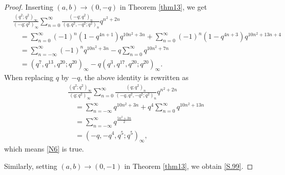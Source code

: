 \documentclass[reqno,12pt]{amsart}
\theoremstyle{remark}
\numberwithin{equation}{section}
\begin{document}
\begin{proof}
Inserting %
$\left(a,b\right)\to\left(0,-q\right)$ in Theorem \ref{thm13}, we get
\begin{align*}
&\frac{\left(q^2;q^2\right)_{\infty}}{\left(-q;q^2\right)_{\infty}}
\sum_{n=0}^{\infty}\frac{\left(-q;q^2\right)_n}{\left(q,q^2,-q^2;q^2\right)_n}q^{n^2+2n}\\
&\quad=\sum_{n=0}^{\infty}\left(-1\right)^n\left(1-q^{4n+1}\right)q^{10n^2+3n}
+\sum_{n=0}^{\infty}\left(-1\right)^n\left(1-q^{4n+3}\right)q^{10n^2+13n+4}\\
&\quad=\sum_{n=-\infty}^{\infty}\left(-1\right)^nq^{10n^2+3n}-q\sum_{n=0}^{\infty}q^{10n^2+7n}\\
&\quad=\left(q^7,q^{13},q^{20};q^{20}\right)_{\infty}-q\left(q^3,q^{17},q^{20};q^{20}\right)_{\infty}.
\end{align*}
When replacing $q$ by $-q$,   the above identity is rewritten as
\begin{align*}
&\frac{\left(q^2;q^2\right)_{\infty}}{\left(q;q^2\right)_{\infty}}
\sum_{n=0}^{\infty}\frac{\left(q;q^2\right)_n}{\left(-q,q^2,-q^2;q^2\right)_n}q^{n^2+2n}\\
&\quad=\sum_{n=-\infty}^{\infty}q^{10n^2+3n}+q^4\sum_{n=0}^{\infty}q^{10n^2+13n}\\
&\quad=\sum_{n=-\infty}^{\infty}q^{\frac{5n^2+3n}{2}}\\
&\quad=\left(-q,-q^4,q^5;q^5\right)_{\infty},
\end{align*}
which means \ref{N6} is true.

Similarly, setting $\left(a,b\right)\to\left(0,-1\right)$ in Theorem \ref{thm13}, we obtain \eqref{S.99}.
\end{proof}
\end{document}
